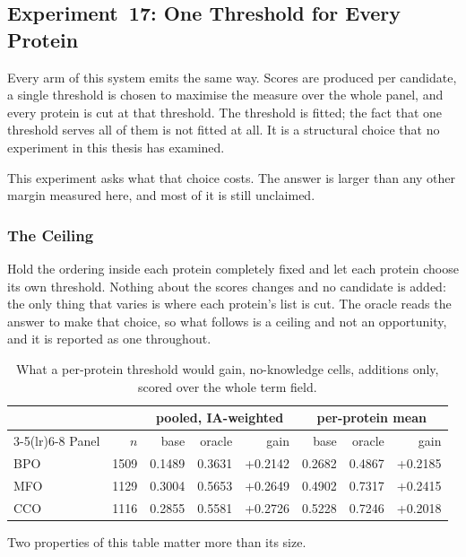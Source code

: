\subsection{Experiment~17: One Threshold for Every Protein}
\label{sec:exp17-calibration-wall}

Every arm of this system emits the same way. Scores are produced per candidate,
a single threshold is chosen to maximise the measure over the whole panel, and
every protein is cut at that threshold. The threshold is fitted; the fact that
one threshold serves all of them is not fitted at all. It is a structural
choice that no experiment in this thesis has examined.

This experiment asks what that choice costs. The answer is larger than any
other margin measured here, and most of it is still unclaimed.

\subsubsection{The Ceiling}

Hold the ordering inside each protein completely fixed and let each protein
choose its own threshold. Nothing about the scores changes and no candidate is
added: the only thing that varies is where each protein's list is cut. The
oracle reads the answer to make that choice, so what follows is a ceiling and
not an opportunity, and it is reported as one throughout.

\begin{table}[htbp]
\centering
\caption{What a per-protein threshold would gain, no-knowledge cells, additions
only, scored over the whole term field.}
\label{tab:exp17-ceiling}
\begin{tabular}{lrrrrrrr}
\toprule
 & & \multicolumn{3}{c}{pooled, IA-weighted} & \multicolumn{3}{c}{per-protein mean} \\
\cmidrule(lr){3-5}\cmidrule(lr){6-8}
Panel & $n$ & base & oracle & gain & base & oracle & gain \\
\midrule
BPO & 1509 & 0.1489 & 0.3631 & +0.2142 & 0.2682 & 0.4867 & +0.2185 \\
MFO & 1129 & 0.3004 & 0.5653 & +0.2649 & 0.4902 & 0.7317 & +0.2415 \\
CCO & 1116 & 0.2855 & 0.5581 & +0.2726 & 0.5228 & 0.7246 & +0.2018 \\
\bottomrule
\end{tabular}
\end{table}

Two properties of this table matter more than its size.

